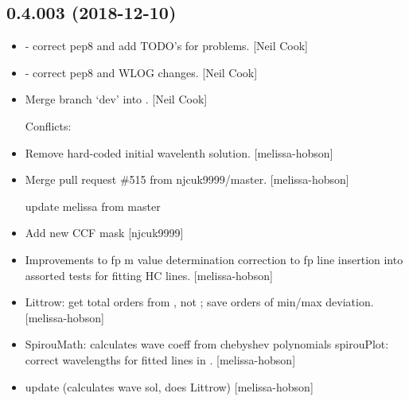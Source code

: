 \documentclass[a4paper,10pt,english]{report}
\begin{document}
\subsection{0.4.003 (2018-12-10)}
\label{\detokenize{misc/changelog:id242}}\begin{itemize}
\item {} 
 - correct pep8 and add TODO’s for problems.
{[}Neil Cook{]}

\item {} 
 - correct pep8 and WLOG changes. {[}Neil
Cook{]}

\item {} 
Merge branch ‘dev’ into . {[}Neil Cook{]}
\begin{description}
\item[{Conflicts:}] \leavevmode
{}

\end{description}

\item {} 
Remove hard-coded initial wavelenth solution. {[}melissa-hobson{]}

\item {} 
Merge pull request \#515 from njcuk9999/master. {[}melissa-hobson{]}

update melissa from master

\item {} 
Add new CCF mask  {[}njcuk9999{]}

\item {} 
Improvements to  fp m value determination
correction to fp line insertion into  assorted tests for
fitting HC lines. {[}melissa-hobson{]}

\item {} 
Littrow: get total orders from , not ; save
orders of min/max deviation. {[}melissa-hobson{]}

\item {} 
SpirouMath: calculates wave coeff from chebyshev polynomials
spirouPlot: correct wavelengths for fitted lines in
. {[}melissa-hobson{]}

\item {} 
 update (calculates wave sol, does Littrow)
{[}melissa-hobson{]}


\end{itemize}
\end{document}
